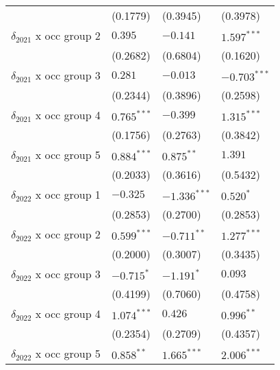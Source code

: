 \begin{tabular}{llll}
                                         &           (0.1779) &           (0.3945) &           (0.3978) \\
$\delta_{2021}$ x occ group 2            &            $0.395$ &           $-0.141$ &      $1.597^{***}$ \\
                                         &           (0.2682) &           (0.6804) &           (0.1620) \\
$\delta_{2021}$ x occ group 3            &            $0.281$ &           $-0.013$ &     $-0.703^{***}$ \\
                                         &           (0.2344) &           (0.3896) &           (0.2598) \\
$\delta_{2021}$ x occ group 4            &      $0.765^{***}$ &           $-0.399$ &      $1.315^{***}$ \\
                                         &           (0.1756) &           (0.2763) &           (0.3842) \\
$\delta_{2021}$ x occ group 5            &      $0.884^{***}$ &       $0.875^{**}$ &            $1.391$ \\
                                         &           (0.2033) &           (0.3616) &           (0.5432) \\
$\delta_{2022}$ x occ group 1            &           $-0.325$ &     $-1.336^{***}$ &          $0.520^*$ \\
                                         &           (0.2853) &           (0.2700) &           (0.2853) \\
$\delta_{2022}$ x occ group 2            &      $0.599^{***}$ &      $-0.711^{**}$ &      $1.277^{***}$ \\
                                         &           (0.2000) &           (0.3007) &           (0.3435) \\
$\delta_{2022}$ x occ group 3            &         $-0.715^*$ &         $-1.191^*$ &            $0.093$ \\
                                         &           (0.4199) &           (0.7060) &           (0.4758) \\
$\delta_{2022}$ x occ group 4            &      $1.074^{***}$ &            $0.426$ &       $0.996^{**}$ \\
                                         &           (0.2354) &           (0.2709) &           (0.4357) \\
$\delta_{2022}$ x occ group 5            &       $0.858^{**}$ &      $1.665^{***}$ &      $2.006^{***}$ \\

\end{tabular}
